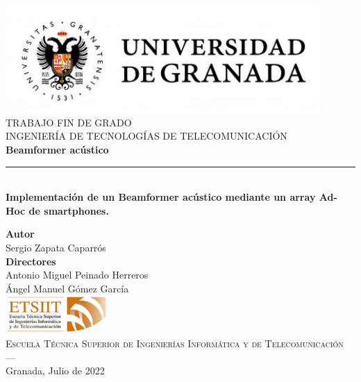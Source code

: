 \begin{titlepage}
 
 
\newlength{\centeroffset}
\setlength{\centeroffset}{-0.5\oddsidemargin}
\addtolength{\centeroffset}{0.5\evensidemargin}
\thispagestyle{empty}

\noindent\hspace*{\centeroffset}\begin{minipage}{\textwidth}

\centering
\includegraphics[width=0.9\textwidth]{imagenes/logo_ugr.jpg}\\[1.4cm]

\textsc{ \Large TRABAJO FIN DE GRADO\\[0.2cm]}
\textsc{INGENIERÍA DE TECNOLOGÍAS DE TELECOMUNICACIÓN}\\[1cm]
% 
{\Huge\bfseries Beamformer acústico\\
}
\noindent\rule[-1ex]{\textwidth}{3pt}\\[3.5ex]
{\large\bfseries Implementación de un Beamformer acústico mediante un array Ad-Hoc de smartphones.}
\end{minipage}

\vspace{1cm}
\noindent\hspace*{\centeroffset}\begin{minipage}{\textwidth}
\centering

\textbf{Autor}\\ {Sergio Zapata Caparrós}\\[2.5ex]
\textbf{Directores}\\
{Antonio Miguel Peinado Herreros\\
Ángel Manuel Gómez García}\\[2cm]
\includegraphics[width=0.3\textwidth]{imagenes/etsiit_logo.png}\\[0.1cm]
\textsc{Escuela Técnica Superior de Ingenierías Informática y de Telecomunicación}\\
\textsc{---}\\
Granada, Julio de 2022
\end{minipage}
\end{titlepage}


